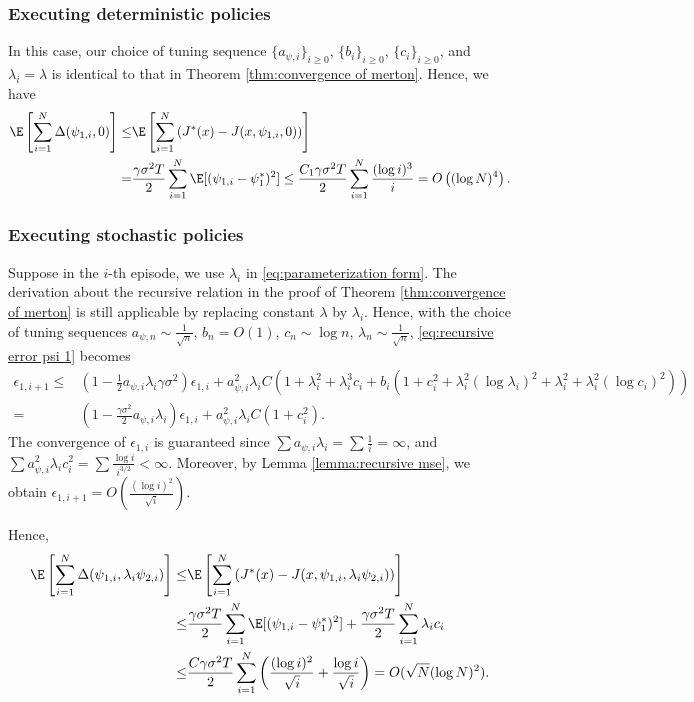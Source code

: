 \subsubsection{Executing deterministic policies}
In this case, our choice of tuning sequence $\{a_{\psi,i}\}_{i\geq 0}$, $\{b_i\}_{i\geq 0}$, $\{c_i\}_{i\geq 0}$, and $\lambda_i = \lambda$ is identical to that in Theorem \ref{thm:convergence of merton}. Hence, we have 
\[ \begin{aligned}
\E\left[ \sum_{i=1}^N  \Delta(\psi_{1,i},0) \right] \leq & \E\left[ \sum_{i=1}^N  \left(  J^*(x) -  J(x,\psi_{1,i},0) \right)\right] \\
= & \frac{\gamma \sigma^2 T}{2}\sum_{i=1}^N \E[(\psi_{1,i} - \psi_1^*)^2] \leq  \frac{C_1 \gamma \sigma^2 T}{2}\sum_{i=1}^N \frac{(\log i)^3}{i} = O\left( (\log N)^4 \right) .
\end{aligned} \]
\subsubsection{Executing stochastic policies}
Suppose in the $i$-th episode, we use $\lambda_i$ in \eqref{eq:parameterization form}. The derivation about the recursive relation in the proof of Theorem \ref{thm:convergence of merton} is still applicable by replacing constant $\lambda$ by $\lambda_i$. Hence, with the choice of tuning sequences $a_{\psi,n} \sim \frac{1}{\sqrt{n}}$, $b_n = O(1)$, $c_n \sim \log n$, $\lambda_n \sim \frac{1}{\sqrt{n}}$, \eqref{eq:recursive error psi 1} becomes
\[\begin{aligned}
\epsilon_{1,i+1} \leq & (1 - \frac{1}{2}a_{\psi,i}\lambda_i\gamma\sigma^2 ) \epsilon_{1,i} + a_{\psi,i}^2\lambda_i C \left( 1 + \lambda_i^2 + \lambda_i^3 c_i + b_i(1 + c_i^2 + \lambda_i^2(\log\lambda_i)^2 + \lambda_i^2 + \lambda_i^2 (\log c_i)^2)  \right) \\
= & (1 - \frac{\gamma\sigma^2}{2}a_{\psi,i}\lambda_i ) \epsilon_{1,i} + a_{\psi,i}^2 \lambda_i C (1 + c_i^2) .
\end{aligned}  \]
The convergence of $\epsilon_{1,i}$ is guaranteed since $\sum  a_{\psi,i}\lambda_i = \sum \frac{1}{i} = \infty$, and $\sum a_{\psi,i}^2 \lambda_i c_i^2 = \sum \frac{\log i}{i^{3/2} } < \infty $. Moreover, by Lemma \ref{lemma:recursive mse}, we obtain $\epsilon_{1,i+1}  = O\left( \frac{(\log i)^2}{\sqrt{i}}\right)$.

Hence, 
\[ \begin{aligned}
\E\left[ \sum_{i=1}^N  \Delta(\psi_{1,i},\lambda_i \psi_{2,i}) \right] \leq & \E\left[ \sum_{i=1}^N  \left(  J^*(x) -  J(x,\psi_{1,i},\lambda_i \psi_{2,i}) \right)\right] \\
\leq & \frac{\gamma \sigma^2 T}{2}\sum_{i=1}^N \E[(\psi_{1,i} - \psi_1^*)^2] + \frac{\gamma \sigma^2 T}{2}\sum_{i=1}^N \lambda_i c_i \\
\leq & \frac{C \gamma \sigma^2 T}{2}\sum_{i=1}^N \left( \frac{(\log i)^2 }{\sqrt{i} } + \frac{\log i}{\sqrt{i} } \right)  = O(\sqrt{N} (\log N)^2).
\end{aligned} \]

\vskip 0.2in


 